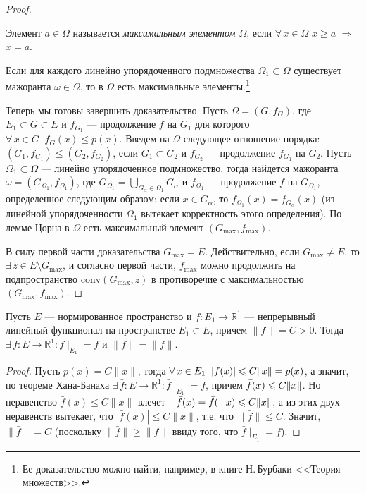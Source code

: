 \documentclass[10pt]{article}
\newcommand*{\p}[1]{#1\nobreak\discretionary{}{\hbox{$\mathsurround=0pt #1$}}{}}
\begin{document}
\begin{proof}
\begin{df}
Элемент $a\in\Omega$ называется \emph{максимальным элементом
$\Omega$}, если $\forall\,x\in\Omega$ $x\geqslant a$ $\Rightarrow$
$x=a$.
\end{df}

\begin{lemma}
Если для каждого линейно упорядоченного подмножества
$\Omega_1\subset \Omega$ существует мажоранта $\omega\in\Omega$, то
в $\Omega$ есть максимальные элементы.\footnote{Ее доказательство
можно найти, например, в книге Н.\,Бурбаки <<Теория множеств>>.}
\end{lemma}

Теперь мы готовы завершить доказательство. Пусть $\Omega=(G, f_G)$,
где $E_1\subset G\subset E$ и $f_{G_1}$ --- продолжение $f$ на $G_1$
для которого $\forall\,x\in G\;\;f_G(x)\leqslant p(x)$. Введем на
$\Omega$ следующее отношение порядка:
$(G_1,f_{G_1})\leqslant(G_2,f_{G_2})$, если $G_1\subset G_2$ и
$f_{G_2}$ --- продолжение $f_{G_1}$ на $G_2$. Пусть $\Omega_1\subset
\Omega$ --- линейно упорядоченное подмножество, тогда найдется
мажоранта $\omega=(G_{\Omega_1},f_{\Omega_1})$, где
$G_{\Omega_1}=\bigcup\limits_{G_\alpha\in\Omega_1}G_\alpha$ и
$f_{\Omega_1}$ --- продолжение $f$ на $G_{\Omega_1}$, определенное
следующим образом: если $x\in G_\alpha$, то
$f_{\Omega_1}(x)=f_{G_\alpha}(x)$ (из линейной упорядоченности
$\Omega_1$ вытекает корректность этого определения). По лемме Цорна
в $\Omega$ есть максимальный элемент $(G_{\max},f_{\max})$.

В силу первой части доказательства $G_{\max}=E$. Действительно, если
$G_{\max}\neq E$, то $\exists\,z\in E\setminus G_{\max}$, и согласно
первой части, $f_{\max}$ можно продолжить на подпространство
$\mathrm{conv}(G_{\max},z)$ в противоречие с максимальностью
$(G_{\max},f_{\max})$.
\end{proof}

\begin{imp}
Пусть $E$ --- нормированное пространство и $f\colon
E_1\to\mathbb{R}^1$ --- непрерывный линейный функционал на
пространстве $E_1\subset E$, причем $\|f\|=C>0$. Тогда
$\exists\,\bar{f}\colon E\to \mathbb{R}^1:\bar{f}\mid_{E_1}=f$ и
$\|\bar{f}\|=\|f\|$.
\end{imp}

\begin{proof}
Пусть $p(x)=C\|x\|$, тогда $\forall\,x\in E_1\;\;|f(x)|\p\leqslant
C\|x\|\p=p(x)$, а значит, по теореме Хана-Банаха
$\exists\,\bar{f}\colon E\to\mathbb{R}^1: \bar{f}\mid_{E_1}=f$,
причем $\bar{f}(x)\p\leqslant C\|x\|$. Но неравенство
$\bar{f}(x)\leqslant C\|x\|$ влечет
$-\bar{f}(x)=\bar{f}(-x)\p\leqslant C\|x\|$, а из этих двух
неравенств вытекает, что $|\bar{f}(x)|\leqslant C\|x\|$, т.е. что
$\|\bar{f}\|\leqslant C$. Значит, $\|\bar{f}\|=C$ (поскольку
$\|\bar{f}\|\geqslant\|f\|$ ввиду того, что $\bar{f}\mid_{E_1}=f$).
\end{proof}
\end{document}
